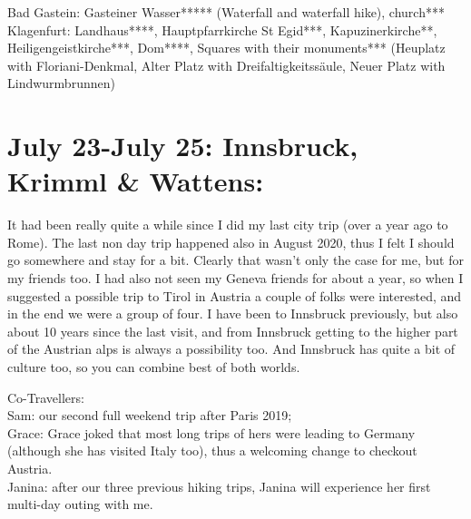 {Bad Gastein: Gasteiner Wasser***** (Waterfall and waterfall hike), church***\\
Klagenfurt: Landhaus****, Hauptpfarrkirche St Egid***, Kapuzinerkirche**, Heiligengeistkirche***, Dom****, Squares with their monuments*** (Heuplatz with Floriani-Denkmal, Alter Platz with Dreifaltigkeitss\"aule, Neuer Platz with Lindwurmbrunnen)\\

\section{July 23-July 25: Innsbruck, Krimml \& Wattens:}
\label{2021Innsbruck}

It had been really quite a while since I did my last city trip (over a year ago to Rome). The last non day trip happened also in August 2020, thus I felt I should go somewhere and stay for a bit. Clearly that wasn't only the case for me, but for my friends too.
I had also not seen my Geneva friends for about a year, so when I suggested a possible trip to Tirol in Austria a couple of folks were interested, and in the end we were a group of four. I have been to Innsbruck previously, but also about 10 years since the last visit, and from Innsbruck getting to the higher part of the Austrian alps is always a possibility too. And Innsbruck has quite a bit of culture too, so you can combine best of both worlds.

Co-Travellers:\\
Sam: our second full weekend trip after Paris 2019;\\
Grace: Grace joked that most long trips of hers were leading to Germany (although she has visited Italy too), thus a welcoming change to checkout Austria.\\
Janina: after our three previous hiking trips, Janina will experience her first multi-day outing with me.\\

}
